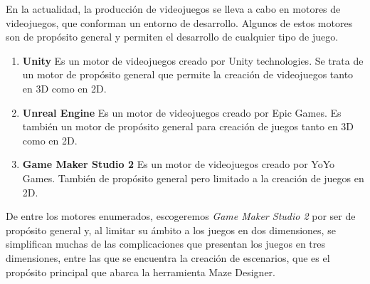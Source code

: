 En la actualidad, la producción de videojuegos se lleva a cabo en motores de videojuegos, que conforman un entorno de desarrollo. Algunos de estos motores son de propósito general y permiten el desarrollo de cualquier tipo de juego.
\begin{enumerate}
	\item \textbf{Unity} Es un motor de videojuegos creado por Unity technologies. Se trata de un motor de propósito general que permite la creación de videojuegos tanto en 3D como en 2D.
	\item \textbf{Unreal Engine} Es un motor de videojuegos creado por Epic Games. Es también un motor de propósito general para creación de juegos tanto en 3D como en 2D.
	\item \textbf{Game Maker Studio 2} Es un motor de videojuegos creado por YoYo Games. También de propósito general pero limitado a la creación de juegos en 2D.
\end{enumerate}

De entre los motores enumerados, escogeremos \textit{Game Maker Studio 2} por ser de propósito general y, al limitar su ámbito a los juegos en dos dimensiones, se simplifican muchas de las complicaciones que presentan los juegos en tres dimensiones, entre las que se encuentra la creación de escenarios, que es el propósito principal que abarca la herramienta Maze Designer.